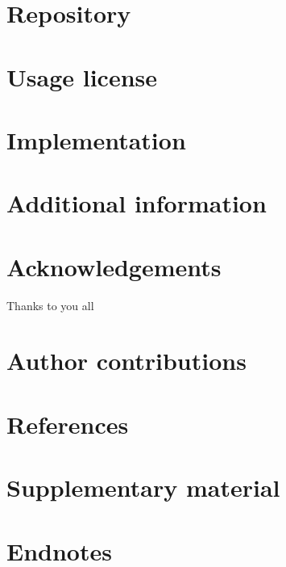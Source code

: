 \documentclass[
]{article}
\begin{document}
\hypertarget{repository}{%
\section{Repository}\label{repository}}

\hypertarget{usage-license}{%
\section{Usage license}\label{usage-license}}

\hypertarget{implementation}{%
\section{Implementation}\label{implementation}}

\hypertarget{additional-information}{%
\section{Additional information}\label{additional-information}}

\hypertarget{acknowledgements}{%
\section{Acknowledgements}\label{acknowledgements}}

Thanks to you all

\hypertarget{author-contributions}{%
\section{Author contributions}\label{author-contributions}}

\hypertarget{references}{%
\section{References}\label{references}}

\hypertarget{supplementary-material}{%
\section{Supplementary material}\label{supplementary-material}}

\hypertarget{endnotes}{%
\section*{Endnotes}\label{endnotes}}
\end{document}
